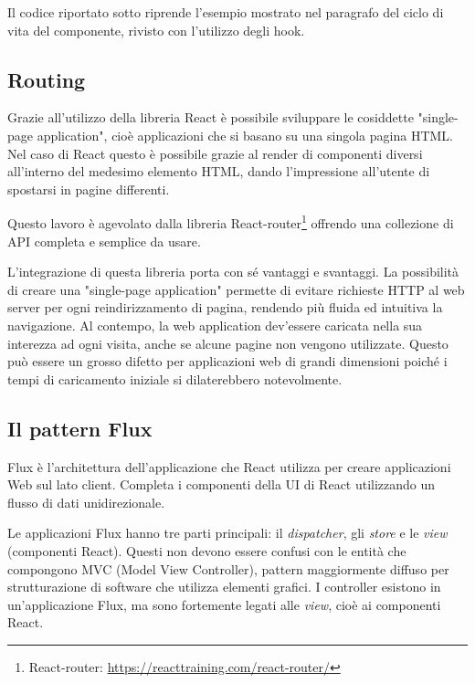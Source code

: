 Il codice riportato sotto riprende l'esempio mostrato nel paragrafo del ciclo di vita del componente, rivisto con l'utilizzo degli hook.



\subsection{Routing}
\label{sec:routing}
Grazie all'utilizzo della libreria React è possibile sviluppare le cosiddette "single-page application", cioè applicazioni che si basano su una singola pagina HTML. Nel caso di React questo è possibile grazie al render di componenti diversi all'interno del medesimo elemento HTML, dando l'impressione all'utente di spostarsi in pagine differenti. 

Questo lavoro è agevolato dalla libreria React-router\footnote{React-router: \url{https://reacttraining.com/react-router/}} offrendo una collezione di API completa e semplice da usare. 

L'integrazione di questa libreria porta con sé vantaggi e svantaggi. La possibilità di creare una "single-page application" permette di evitare richieste HTTP al web server per ogni reindirizzamento di pagina, rendendo più fluida ed intuitiva la navigazione. Al contempo, la web application dev'essere caricata nella sua interezza ad ogni visita, anche se alcune pagine non vengono utilizzate. Questo può essere un grosso difetto per applicazioni web di grandi dimensioni poiché i tempi di caricamento iniziale si dilaterebbero notevolmente.

\subsection{Il pattern Flux}
\label{sec:flux}

Flux è l'architettura dell'applicazione che React utilizza per creare applicazioni Web sul lato client. Completa i componenti della UI di React utilizzando un flusso di dati unidirezionale.

Le applicazioni Flux hanno tre parti principali: il \textit{dispatcher}, gli \textit{store} e le \textit{view} (componenti React). Questi non devono essere confusi con le entità che compongono MVC (Model View Controller), pattern maggiormente diffuso per strutturazione di software che utilizza elementi grafici. I controller esistono in un'applicazione Flux, ma sono fortemente legati alle \textit{view}, cioè ai componenti React.


